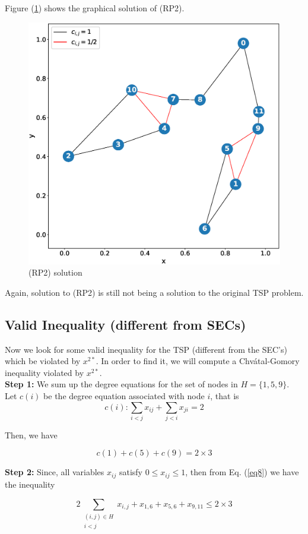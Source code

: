 \documentclass[12pt]{article}
\begin{document}
Figure (\ref{f5}) shows the graphical solution of (RP2).
\begin{figure}[H]
\centering
    \includegraphics[width=0.7\linewidth]{f6.eps} 
  \caption{(RP2) solution}
  \label{f5}
\end{figure}
Again, solution to (RP2) is still not being a solution to the original TSP problem.

\subsection{Valid Inequality (different from SECs)}
Now we look for some valid inequality for the TSP (different from the SEC's) which be violated by $x^{2*}$. In order to find it, we will compute a Chvátal-Gomory inequality violated by $x^{2*}$. \\

\textbf{Step 1:}
We sum up the degree equations for the set of nodes in $H = \{1,5,9\}$.
Let $c(i)$ be the degree equation associated with node $i$, that is
\begin{equation}
    c(i): \sum_{i<j}x_{ij} + \sum_{j<i}x_{ji} = 2 
\end{equation}

Then, we have

\begin{equation}
   c(1)+c(5)+c(9) = 2\times3
   \label{eq8}
\end{equation}

\textbf{Step 2:}
Since, all variables $x_{ij}$ satisfy $0 \leq x_{ij}\leq 1$, then from Eq. (\ref{eq8}) we have the inequality

\begin{equation}
   2\sum_{\substack{(i,j) \in H\\i<j}}x_{i,j} + x_{1,6}+x_{5,6}+x_{9,11} \leq 2\times3
   \label{eq9}
\end{equation}
\end{document}

